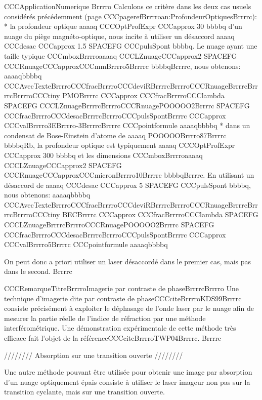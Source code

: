 CCCApplicationNumerique
Brrrro
Calculons ce critère dans les deux cas usuels considérés précédemment (page CCCpagerefBrrrroan:ProfondeurOptiquesBrrrrc):
	* la profondeur optique aaaaq CCCOptProfExpr CCCapprox 30 bbbbq d'un nuage du piège magnéto-optique, nous incite à utiliser un désaccord aaaaq CCCdesac CCCapprox 1.5 SPACEFG CCCpulsSpont bbbbq. Le nuage ayant une taille typique CCCmboxBrrrroaaaaq CCCLZnuageCCCapprox2 SPACEFG CCCRnuageCCCapproxCCCmmBrrrro5Brrrrc bbbbqBrrrrc, nous obtenons:
aaaaqbbbbq
CCCAvecTexteBrrrroCCCfracBrrrroCCCdeviRBrrrrcBrrrroCCCRnuageBrrrrcBrrrrcBrrrroCCCtiny PMOBrrrrc CCCapprox  CCCfracBrrrroCCClambda SPACEFG CCCLZnuageBrrrrcBrrrroCCCRnuagePOOOOO2Brrrrc 
 SPACEFG  CCCfracBrrrroCCCdesacBrrrrcBrrrroCCCpulsSpontBrrrrc 
 CCCapprox  CCCvalBrrrro3EBrrrro-3BrrrrcBrrrrc
CCCpointformule
aaaaqbbbbq
* dans un condensat de Bose-Einstein d'atome de aaaaq POOOOOBrrrro87Brrrrc bbbbqRb, la profondeur optique est typiquement aaaaq CCCOptProfExpr CCCapprox 300 bbbbq et les dimensions CCCmboxBrrrroaaaaq CCCLZnuageCCCapprox2 SPACEFG CCCRnuageCCCapproxCCCmicronBrrrro10Brrrrc bbbbqBrrrrc. En utilisant un désaccord de aaaaq CCCdesac CCCapprox 5 SPACEFG CCCpulsSpont bbbbq, nous obtenons:
aaaaqbbbbq
CCCAvecTexteBrrrroCCCfracBrrrroCCCdeviRBrrrrcBrrrroCCCRnuageBrrrrcBrrrrcBrrrroCCCtiny BECBrrrrc CCCapprox   CCCfracBrrrroCCClambda SPACEFG CCCLZnuageBrrrrcBrrrroCCCRnuagePOOOOO2Brrrrc 
 SPACEFG  CCCfracBrrrroCCCdesacBrrrrcBrrrroCCCpulsSpontBrrrrc 
 CCCapprox  CCCvalBrrrro5Brrrrc
CCCpointformule
aaaaqbbbbq

On peut donc a priori utiliser un laser désaccordé dans le premier cas, mais pas dans le second.
Brrrrc

CCCRemarqueTitreBrrrroImagerie par contraste de phaseBrrrrcBrrrro
Une technique d'imagerie dite par contraste de phaseCCCciteBrrrroKDS99Brrrrc consiste précisément à exploiter le déphasage de l'onde laser par le nuage afin de mesurer la partie réelle de l'indice de réfraction par une méthode interférométrique. 
Une démonstration expérimentale de cette méthode très efficace fait l'objet de la référenceCCCciteBrrrroTWP04Brrrrc.
Brrrrc





//////// Absorption sur une transition ouverte ////////


Une autre méthode pouvant être utilisée pour obtenir une image par absorption d'un nuage optiquement épais consiste à utiliser le laser imageur non pas sur la transition cyclante, mais sur une transition ouverte. 

